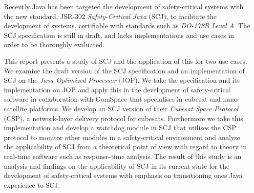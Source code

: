 Recently Java has been targeted the development of safety-critical systems with the new standard, JSR-302 \textit{Safety-Critical Java} (SCJ), to facilitate the development of systems, certifiable with standards such as \textit{DO-178B Level A}. The SCJ specification is still in draft, and lacks implementations and use cases in order to be thoroughly evaluated. 

This report presents a study of SCJ and the application of this for two use cases.
We examine the draft version of the SCJ specification and an implementation of SCJ on the \textit{Java Optimized Processor} (JOP). We take the specification and its implementation on JOP and apply this in the development of safety-critical software in collaboration with GomSpace that specialises in cubesat and nano-satellite platforms. We develop an SCJ version of their \textit{Cubesat Space Protocol} (CSP), a network-layer delivery protocol for cubesats. Furthermore we take this implementation and develop a watchdog module in SCJ that utilises the CSP protocol to monitor other modules in a safety-critical environment and analyse the applicability of SCJ from a theoretical point of view with regard to theory in real-time software such as response-time analysis. The result of this study is an analysis and findings on the applicability of SCJ in its current state for the development of safety-critical systems with emphasis on transitioning ones Java experience to SCJ.